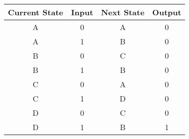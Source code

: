 \begin{table}[]
\begin{tabular}{|c|c|c|c|}
\hline
\rowcolor[HTML]{FD6864} 
\textbf{Current State} & \textbf{Input} & \textbf{Next State} & \textbf{Output} \\ \hline
A                      & 0              & A                   & 0               \\ \hline
A                      & 1              & B                   & 0               \\ \hline
B                      & 0              & C                   & 0               \\ \hline
B                      & 1              & B                   & 0               \\ \hline
C                      & 0              & A                   & 0               \\ \hline
C                      & 1              & D                   & 0               \\ \hline
D                      & 0              & C                   & 0               \\ \hline
D                      & 1              & B                   & 1               \\ \hline
\end{tabular}
\end{table}